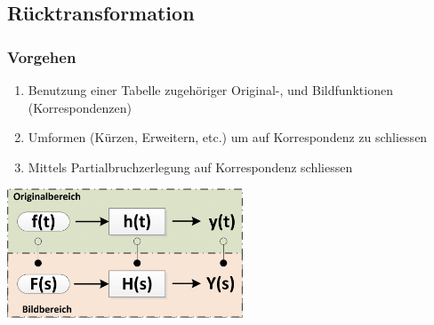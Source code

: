 \subsection{Rücktransformation}
\subsubsection{Vorgehen}
\begin{minipage}{12cm}
	\begin{enumerate}
		\item Benutzung einer Tabelle zugehöriger Original-, und Bildfunktionen (Korrespondenzen)
		\item Umformen (Kürzen, Erweitern, etc.) um auf Korrespondenz zu schliessen
		\item Mittels Partialbruchzerlegung auf Korrespondenz schliessen
	\end{enumerate}
\end{minipage}
\begin{minipage}{7cm}
	\includegraphics[width=7cm]{images/IntTra.jpg}
\end{minipage}

